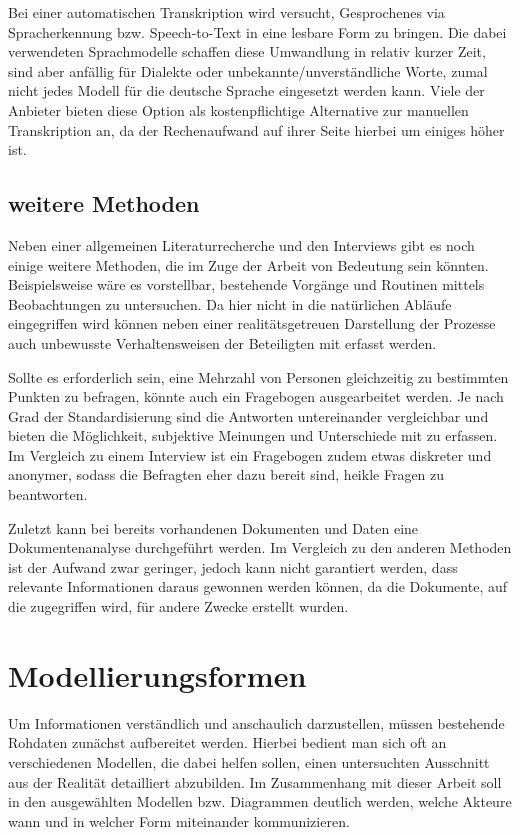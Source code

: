 Bei einer automatischen Transkription wird versucht, Gesprochenes via Spracherkennung bzw. Speech-to-Text in eine lesbare Form zu bringen. Die dabei verwendeten Sprachmodelle schaffen diese Umwandlung in relativ kurzer Zeit, sind aber anfällig für Dialekte oder unbekannte/unverständliche Worte, zumal nicht jedes Modell für die deutsche Sprache eingesetzt werden kann. Viele der Anbieter bieten diese Option als kostenpflichtige Alternative zur manuellen Transkription an, da der Rechenaufwand auf ihrer Seite hierbei um einiges höher ist.

\subsection{weitere Methoden}

Neben einer allgemeinen Literaturrecherche und den Interviews gibt es noch einige weitere Methoden, die im Zuge der Arbeit von Bedeutung sein könnten. Beispielsweise wäre es vorstellbar, bestehende Vorgänge und Routinen mittels Beobachtungen zu untersuchen. Da hier nicht in die natürlichen Abläufe eingegriffen wird können neben einer realitätsgetreuen Darstellung der Prozesse auch unbewusste Verhaltensweisen der Beteiligten mit erfasst werden.

Sollte es erforderlich sein, eine Mehrzahl von Personen gleichzeitig zu bestimmten Punkten zu befragen, könnte auch ein Fragebogen ausgearbeitet werden. Je nach Grad der Standardisierung sind die Antworten untereinander vergleichbar und bieten die Möglichkeit, subjektive Meinungen und Unterschiede mit zu erfassen. Im Vergleich zu einem Interview ist ein Fragebogen zudem etwas diskreter und anonymer, sodass die Befragten eher dazu bereit sind, heikle Fragen zu beantworten.

Zuletzt kann bei bereits vorhandenen Dokumenten und Daten eine Dokumentenanalyse durchgeführt werden. Im Vergleich zu den anderen Methoden ist der Aufwand zwar geringer, jedoch kann nicht garantiert werden, dass relevante Informationen daraus gewonnen werden können, da die Dokumente, auf die zugegriffen wird, für andere Zwecke erstellt wurden. \citep{Doering.2015}


\section{Modellierungsformen}\label{sec:modeling}

Um Informationen verständlich und anschaulich darzustellen, müssen bestehende Rohdaten zunächst aufbereitet werden. Hierbei bedient man sich oft an verschiedenen Modellen, die dabei helfen sollen, einen untersuchten Ausschnitt aus der Realität detailliert abzubilden. Im Zusammenhang mit dieser Arbeit soll in den ausgewählten Modellen bzw. Diagrammen deutlich werden, welche Akteure wann und in welcher Form miteinander kommunizieren.


